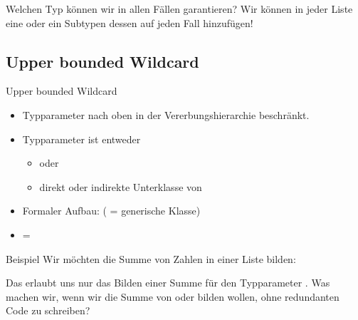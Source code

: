 \documentclass{../tuda-beamer}
\begin{document}
    \begin{frame}[c]{Welchen Typ können wir in allen Fällen garantieren?}
        Wir können in jeder Liste eine  oder ein Subtypen dessen
        auf jeden Fall hinzufügen!

        
    \end{frame}

    \subsection{Upper bounded Wildcard}
    \label{subsec:wildcards-upperbound}
    \begin{frame}[c]{Upper bounded Wildcard}
        \begin{itemize}
            \item Typparameter nach oben in der Vererbungshierarchie beschränkt.
            \item Typparameter ist entweder
            \begin{itemize}
                \item {} oder
                \item direkt oder indirekte Unterklasse von 
            \end{itemize}
            \item Formaler Aufbau:  ( = generische Klasse)
            \item {} = 
        \end{itemize}
    \end{frame}

    \begin{frame}[c]{Beispiel}
        Wir möchten die Summe von Zahlen in einer Liste bilden:

        

        \pause

        Das erlaubt uns nur das Bilden einer Summe für den Typparameter
        .
        Was machen wir, wenn wir die Summe von  oder 
        bilden wollen, ohne redundanten Code zu schreiben?
    \end{frame}
\end{document}
